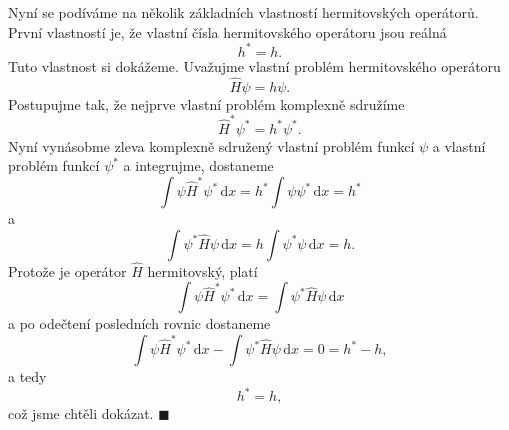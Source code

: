 Nyní se podíváme na několik základních vlastností hermitovských operátorů. První vlastností je, že vlastní čísla hermitovského operátoru jsou reálná
\begin{equation}
\boxed{h^\ast = h.}
\label{rov:RealnaVlastniCisla}
\end{equation}
Tuto vlastnost si dokážeme. Uvažujme vlastní problém hermitovského operátoru
\begin{equation}
\hat{H} \psi = h \psi.
\nonumber
\end{equation}
Postupujme tak, že nejprve vlastní problém komplexně sdružíme
\begin{equation}
\hat{H}^\ast \psi^\ast = h^\ast \psi^\ast.
\nonumber
\end{equation}
Nyní vynásobme zleva komplexně sdružený vlastní problém funkcí $\psi$ a vlastní problém funkcí $\psi^\ast$ a integrujme, dostaneme
\begin{equation}
\int \psi \hat{H}^\ast \psi^\ast \,\mathrm{d}x = h^\ast \int \psi \psi^\ast \,\mathrm{d}x  = h^\ast
\nonumber 
\end{equation}
a
\begin{equation}
\int \psi^\ast \hat{H} \psi \,\mathrm{d}x = h \int \psi^\ast \psi \,\mathrm{d}x  = h.
\nonumber 
\end{equation}
Protože je operátor $\hat{H}$ hermitovský, platí
\begin{equation}
\int \psi \hat{H}^\ast \psi^\ast \,\mathrm{d}x = \int \psi^\ast \hat{H} \psi \,\mathrm{d}x
\nonumber
\end{equation}
a po odečtení posledních rovnic dostaneme
\begin{equation}
\int \psi \hat{H}^\ast \psi^\ast \,\mathrm{d}x - \int \psi^\ast \hat{H} \psi \,\mathrm{d}x =0  = h^\ast - h,
\nonumber
\end{equation}
a tedy
\begin{equation}
h^\ast = h,
\nonumber
\end{equation}
což jsme chtěli dokázat. \hfill {\footnotesize $\blacksquare$}

